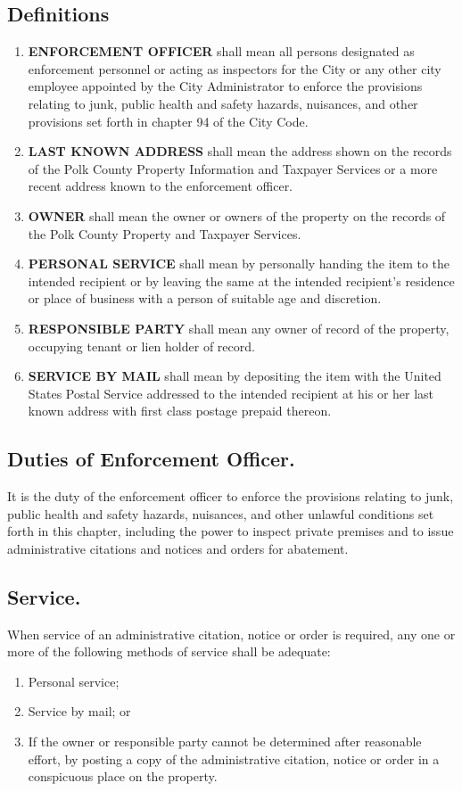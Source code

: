 \subsection{Definitions}
\begin{enumerate}[{\indent}1)]
  \item\textbf{ENFORCEMENT OFFICER} shall mean all persons designated as enforcement personnel or acting as inspectors for the City or any other city employee appointed by the City Administrator to enforce the provisions relating to junk, public health and safety hazards, nuisances, and other provisions set forth in chapter 94 of the City Code.
  \item\textbf{LAST KNOWN ADDRESS} shall mean the address shown on the records of the Polk County Property Information and Taxpayer Services or a more recent address known to the enforcement officer.
  \item\textbf{OWNER} shall mean the owner or owners of the property on the records of the Polk County Property and Taxpayer Services.
  \item\textbf{PERSONAL SERVICE} shall mean by personally handing the item to the intended recipient or by leaving the same at the intended recipient's residence or place of business with a person of suitable age and discretion.
  \item\textbf{RESPONSIBLE PARTY} shall mean any owner of record of the property, occupying tenant or lien holder of record.
  \item\textbf{SERVICE BY MAIL} shall mean by depositing the item with the United States Postal Service addressed to the intended recipient at his or her last known address with first class postage prepaid thereon.
\end{enumerate}
\subsection{Duties of Enforcement Officer.}
It is the duty of the enforcement officer to enforce the provisions relating to junk, public health and safety hazards, nuisances, and other unlawful conditions set forth in this chapter, including the power to inspect private premises and to issue administrative citations and notices and orders for abatement.
\subsection{Service.}
When service of an administrative citation, notice or order is required, any one or more of the following methods of service shall be adequate:
\begin{enumerate}[{\indent}1)]
  \item Personal service;
  \item Service by mail; or
  \item If the owner or responsible party cannot be determined after reasonable effort, by posting a copy of the administrative citation, notice or order in a conspicuous place on the property.
\end{enumerate}
